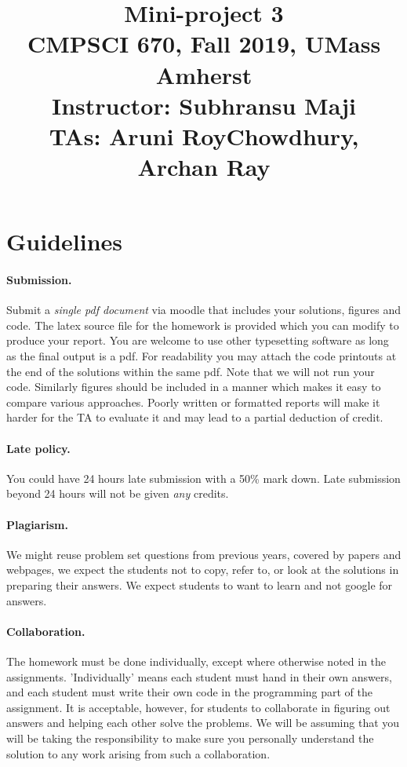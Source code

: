 \documentclass[10pt,letterpaper]{article}
\title{
  \textbf{Mini-project 3} \\
  \Large{CMPSCI 670, Fall 2019, UMass Amherst} \\
  \Large{Instructor: Subhransu Maji} \\
  \Large{TAs: Aruni RoyChowdhury, Archan Ray}
}
\date{}
\begin{document}
\maketitle

\renewcommand\thesubsection{\thesection.\alph{subsection}}


\section*{Guidelines}

\paragraph{Submission.} Submit a \emph{single pdf document} via moodle that includes your solutions, figures and code. The latex source file for the homework is provided which you can modify to produce your report. You are welcome to use other typesetting software as long as the final output is a pdf. For readability you may attach the code printouts at the end of the solutions within the same pdf. Note that we will not run your code. Similarly figures should be included in a manner which makes it easy to compare various approaches. Poorly written or formatted reports will make it harder for the TA to evaluate it and may lead to a partial deduction of credit. 

\paragraph{Late policy.} You could have 24 hours late submission with a 50\% mark down. Late submission beyond 24 hours will not be given \emph{any} credits.

\paragraph{Plagiarism.} We might reuse problem set questions from previous years, covered by papers and webpages, we expect the students not to copy, refer to, or look at the solutions in preparing their answers. We expect students to want to learn and not google for answers. 

\paragraph{Collaboration.} The homework must be done individually, except where otherwise noted in the assignments. 'Individually' means each student must hand in their own answers, and each student must write their own code in the programming part of the assignment. It is acceptable, however, for students to collaborate in figuring out answers and helping each other solve the problems. We will be assuming that you will be taking the responsibility to make sure you personally understand the solution to any work arising from such a collaboration.
\end{document}
